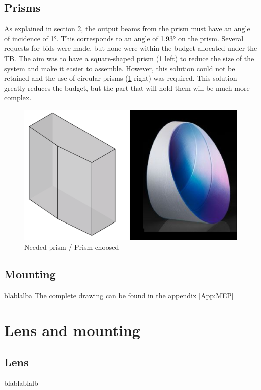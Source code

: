 \subsection{Prisms}
As explained in section 2, the output beams from the prism must have an angle of incidence of 1°. 
This corresponds to an angle of 1.93° on the prism. \newline
Several requests for bids were made, but none were within the budget allocated under the TB. The aim was to have a square-shaped 
prism (\ref{fig:Prism_square} left) to reduce the size of the system and make it easier to assemble. However, this solution could not be retained and the 
use of circular prisms (\ref{fig:Prism_square} right) was required. This solution greatly reduces the budget, but the part that will hold them will be much more complex.
\begin{figure}[H]
    \centering
    \includegraphics[scale=0.6]{assets/figures/Mechanical Design/prisme_voulu.png}
    \caption{Needed prism / Prism choosed}
    \label{fig:Prism_square}
\end{figure}
\subsection{Mounting}
blablalba
\bigbreak
The complete drawing can be found in the appendix \ref{App:MEP}
\section{Lens and mounting}\label{sec:lens}
\subsection{Lens}
blablablalb
